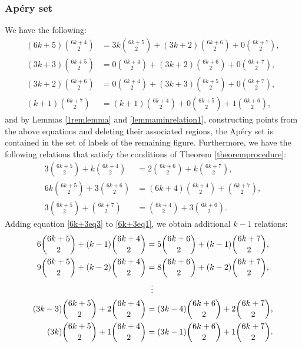 \documentclass[12pt]{article}
\theoremstyle{remark}
\begin{document}
\subsubsection{Ap{\'e}ry set}
We have the following:
\begin{align}
    (6k+5)\binom{6k+4}{2} &= 3k\binom{6k+5}{2} + (3k+2)\binom{6k+6}{2} + 0\binom{6k+7}{2}, \label{6k+3minrelation0} \\
    (3k+3)\binom{6k+5}{2} &= 0\binom{6k+4}{2} + (3k+2)\binom{6k+6}{2} + 0\binom{6k+7}{2}, \label{6k+3minrelation1} \\
    (3k+2)\binom{6k+6}{2} &= 0\binom{6k+4}{2} + (3k+3)\binom{6k+5}{2} + 0\binom{6k+7}{2}, \label{6k+3minrelation2} \\
    (k+1)\binom{6k+7}{2} &= (k+1)\binom{6k+4}{2} + 0\binom{6k+5}{2} + 1\binom{6k+6}{2}, \label{6k+3minrelation3} 
\end{align}
and by Lemmas \ref{1remlemma} and \ref{lemmaminrelation1}, constructing points from the above equations and deleting their associated regions, the Ap{\'e}ry set is contained in the set of labels of the remaining figure.
Furthermore, we have the following relations that satisfy the conditions of Theorem \ref{theoremprocedure}:
\begin{align}
      3 \binom{6k+5}{2} + k \binom{6k+4}{2} &= 2\binom{6k+6}{2} + k\binom{6k+7}{2}, \label{6k+3eq1}\\
  6k\binom{6k+5}{2} + 3\binom{6k+6}{2}  &= (6k+4)\binom{6k+4}{2} +  \binom{6k+7}{2} , \label{6k+3eq2}\\
     3\binom{6k+5}{2} + \binom{6k+7}{2} &= \binom{6k+4}{2} + 3 \binom{6k+6}{2}. \label{6k+3eq3} 
\end{align}
Adding equation \eqref{6k+3eq3} to \eqref{6k+3eq1}, we obtain additional $k-1$ relations:
\begin{equation}\label{6k+3_k-1equations_1}
\begin{aligned}    
6 \binom{6k+5}{2} + (k-1) \binom{6k+4}{2} &= 5\binom{6k+6}{2} + (k-1)\binom{6k+7}{2},\\
9 \binom{6k+5}{2} + (k-2) \binom{6k+4}{2} &= 8\binom{6k+6}{2} + (k-2)\binom{6k+7}{2},\\
 & \hspace{5.6pt}  \vdots      \\
(3k-3) \binom{6k+5}{2} + 2 \binom{6k+4}{2} &= (3k-4)\binom{6k+6}{2} + 2\binom{6k+7}{2}, \\
(3k) \binom{6k+5}{2} + 1 \binom{6k+4}{2} &= (3k-1)\binom{6k+6}{2} + 1\binom{6k+7}{2}.
\end{aligned}
\end{equation}
\end{document}

